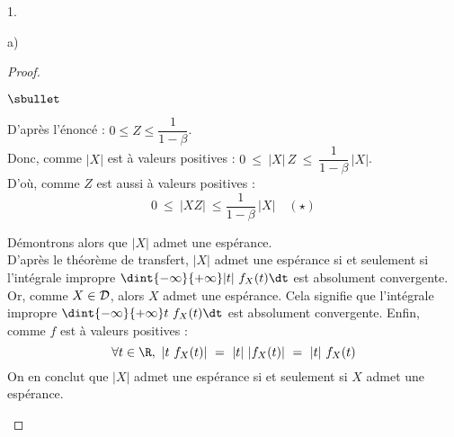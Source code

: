 \begin{noliste}{1.}
\begin{noliste}{a)}
    \begin{proof}~
      \begin{noliste}{$\sbullet$}
      \item D'après l'énoncé : $0 \leq Z \leq \dfrac{1}{1-\beta}$.\\
        Donc, comme $\vert X \vert$ est à valeurs positives : $ 0 \
        \leq \ \vert X \vert \, Z \ \leq \ \dfrac{1}{1-\beta} \,
	\vert X \vert$.\\
	D'où, comme $Z$ est aussi à valeurs positives :
	\[
	  0 \ \leq \ \vert X Z \vert \ \leq \dfrac{1}{1-\beta} \, \vert 
	  X \vert \quad (\star)
	\]

      \item Démontrons alors que $|X|$ admet une espérance.\\
        D'après le théorème de transfert, $|X|$ admet une espérance si
        et seulement si l'intégrale impropre $\dint{-\infty}{+\infty}
        |t| \ f_X(t) \dt$ est absolument convergente.\\[.2cm]
        Or, comme $X \in {\cal D}$, alors $X$ admet une
        espérance. Cela signifie que l'intégrale impropre
        $\dint{-\infty}{+\infty} t \ f_X(t) \dt$ est absolument
        convergente. Enfin, comme $f$ est à valeurs positives :
        \[
        \forall t \in \R, \ |t \ f_X(t)| \ = \ |t| \ |f_X(t)| \ = \
        |t| \ f_X(t)
        \]
        On en conclut que $|X|$ admet une espérance si et seulement si
        $X$ admet une espérance.%


	

\end{noliste}
\end{proof}
\end{noliste}
\end{noliste}
